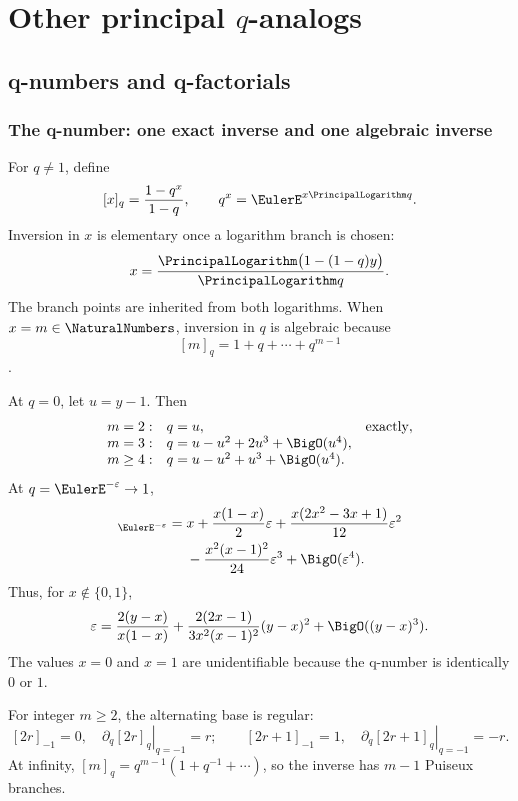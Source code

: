 \documentclass[11pt,letterpaper,oneside,openany]{book}
\theoremstyle{definition}
\theoremstyle{remark}
\begin{document}
\part{Other principal \(q\)-analogs}

\chapter{q-numbers and q-factorials}

\section{The q-number: one exact inverse and one algebraic inverse}
For \(q\ne1\), define
\[
 [x]_q=\frac{1-q^x}{1-q},
 \qquad q^x=\EulerE^{x\PrincipalLogarithm q}.
\]
Inversion in \(x\) is elementary once a logarithm branch is chosen:
\begin{equation}
 x=\frac{\PrincipalLogarithm\bigl(1-(1-q)y\bigr)}{\PrincipalLogarithm q}.
 \label{eq:qnumber-x-inverse}
\end{equation}
The branch points are inherited from both logarithms.  When \(x=m\in\NaturalNumbers\),
inversion in \(q\) is algebraic because
\[
 [m]_q=1+q+\cdots+q^{m-1}
\].

At \(q=0\), let \(u=y-1\).  Then
\[
\begin{array}{rll}
 m=2:&q=u,&\text{exactly},\\
 m=3:&q=u-u^2+2u^3+\BigO(u^4),&\\
 m\ge4:&q=u-u^2+u^3+\BigO(u^4).&
\end{array}
\]
At \(q=\EulerE^{-\varepsilon}\to1\),
\begin{align}
 [x]_{\EulerE^{-\varepsilon}}={}&x+
 \frac{x(1-x)}2\varepsilon
 +\frac{x(2x^2-3x+1)}{12}\varepsilon^2 \notag \\
 &-\frac{x^2(x-1)^2}{24}\varepsilon^3+\BigO(\varepsilon^4).
 \label{eq:qnumber-q1}
\end{align}
Thus, for \(x\notin\{0,1\}\),
\begin{equation}
 \varepsilon=
 \frac{2(y-x)}{x(1-x)}
 +\frac{2(2x-1)}{3x^2(x-1)^2}(y-x)^2
 +\BigO((y-x)^3).
 \label{eq:qnumber-q1-inverse}
\end{equation}
The values \(x=0\) and \(x=1\) are unidentifiable because the q-number is
identically \(0\) or \(1\).

For integer \(m\ge2\), the alternating base is regular:
\[
 [2r]_{-1}=0,
 \quad \left.\partial_q[2r]_q\right|_{q=-1}=r;
 \qquad
 [2r+1]_{-1}=1,
 \quad \left.\partial_q[2r+1]_q\right|_{q=-1}=-r.
\]
At infinity, \([m]_q=q^{m-1}(1+q^{-1}+\cdots)\), so the inverse has
\(m-1\) Puiseux branches.
\end{document}
